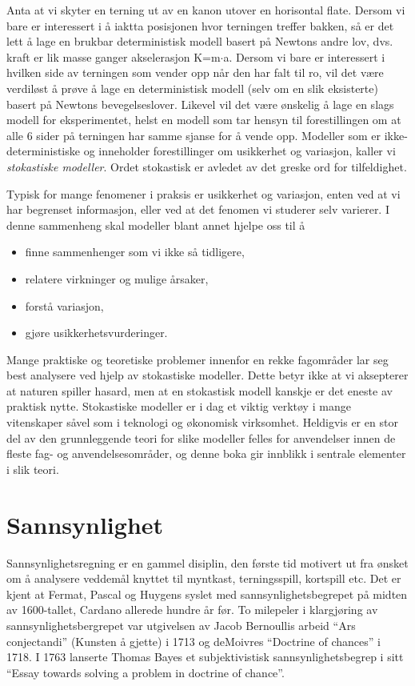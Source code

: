 Anta at vi skyter en terning ut av en kanon utover en horisontal flate. 
Dersom vi bare er interessert i å iaktta posisjonen hvor terningen treffer
bakken, så er det lett å lage en brukbar deterministisk modell
basert på Newtons andre lov, dvs. kraft er lik masse ganger
akselerasjon K=m$\cdot$a.  Dersom vi bare er interessert i hvilken side
av terningen som vender opp når den har falt til ro, vil det være
verdiløst å prøve å lage en deterministisk modell (selv om en
slik eksisterte) basert på Newtons bevegelseslover.  Like\-vel vil
det være ønskelig å lage en slags modell for eksperimentet, helst
en modell som tar hensyn til forestillingen om at alle 6 sider på
terningen har samme sjanse for å vende opp.  Modeller som er
ikke-deterministiske og inne\-holder forestillinger om usikkerhet
og variasjon, kaller vi {\em stokastiske modeller}. 
Ordet stokastisk er avledet av det greske ord for tilfeldighet. 

Typisk for mange fenomener i praksis er usikkerhet og variasjon, enten ved at
vi har begrenset informasjon, eller ved at det fenomen vi studerer selv
varierer. I denne sammenheng skal modeller blant annet hjelpe oss til å
\begin{itemize}
\item    finne sammenhenger som vi ikke så tidligere,
\item    relatere virkninger og mulige årsaker,
\item    forstå variasjon,
\item    gjøre usikkerhetsvurderinger.
\end{itemize}                             

Mange praktiske og teoretiske problemer
innenfor en rekke fagområder lar seg best analysere ved
hjelp av stokastiske modeller.  Dette betyr ikke at vi aksepterer at
naturen spiller hasard, men at en stokastisk modell kanskje er det eneste
av praktisk nytte.  Stokastiske modeller er i dag et viktig
verktøy i mange vitenskaper såvel som i teknologi og økonomisk
virksomhet. Heldigvis er en stor del av den grunnleggende teori for slike modeller
felles for anvendelser innen de fleste fag- og anvendelsesområder, og 
denne boka gir innblikk i sentrale elementer i slik teori.


\section{Sannsynlighet}

Sannsynlighetsregning er en gammel disiplin, den første tid 
motivert ut fra ønsket om å analysere veddemål knyttet til
myntkast, terningsspill, kortspill etc.  Det er kjent at
Fermat, Pascal og Huygens syslet med sannsynlighetsbegrepet på midten av
1600-tallet, Cardano allerede hundre år før.  To milepeler i 
klargjøring av sannsynlighetsbergrepet var
utgivelsen av Jacob Bernoullis arbeid ``Ars conjectandi'' (Kunsten
å gjette) i 1713 og  deMoivres ``Doctrine of chances'' i 1718.
I  1763 lanserte Thomas Bayes et subjektivistisk sannsynlighetsbegrep 
i sitt ``Essay towards solving a problem in doctrine of chance''. 

